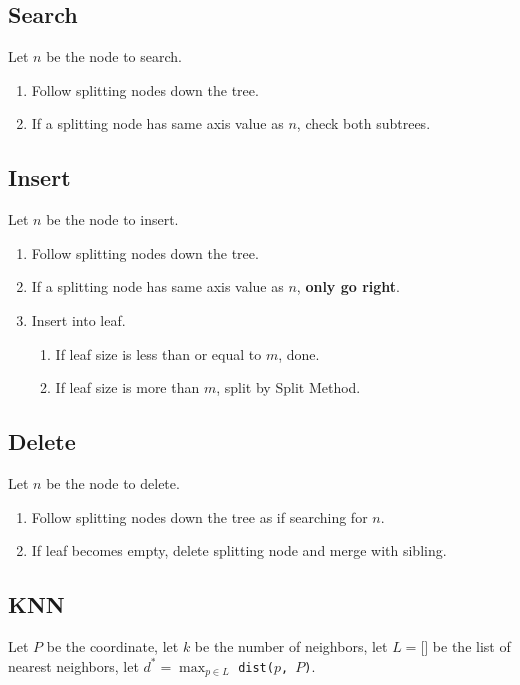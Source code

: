 \documentclass[12pt, letterpaper]{article}
\begin{document}
\begin{multicols*}{3}
        \subsection{Search}
        Let $n$ be the node to search.
        \begin{enumerate}
            \item Follow splitting nodes down the tree.
            \item If a splitting node has same axis value as $n$, check both subtrees.
        \end{enumerate}

        \subsection{Insert}
        Let $n$ be the node to insert.
        \begin{enumerate}
            \item Follow splitting nodes down the tree.
            \item If a splitting node has same axis value as $n$, {\bf only go right}.
            \item Insert into leaf.
            \begin{enumerate}[label=\roman*.]
                \item If leaf size is less than or equal to $m$, done.
                \item If leaf size is more than $m$, split by Split Method.
            \end{enumerate}
        \end{enumerate}

        \subsection{Delete}
        Let $n$ be the node to delete.
        \begin{enumerate}
            \item Follow splitting nodes down the tree as if searching for $n$.
            \item If leaf becomes empty, delete splitting node and merge with sibling.
        \end{enumerate}

        \subsection{KNN}

        Let $P$ be the coordinate, let $k$ be the number of neighbors, let $L = \texttt{[]}$ be the list of nearest neighbors, let $d^* = \max_{p \in L}$ \texttt{dist($p$, $P$)}.


\end{multicols*}
\end{document}
